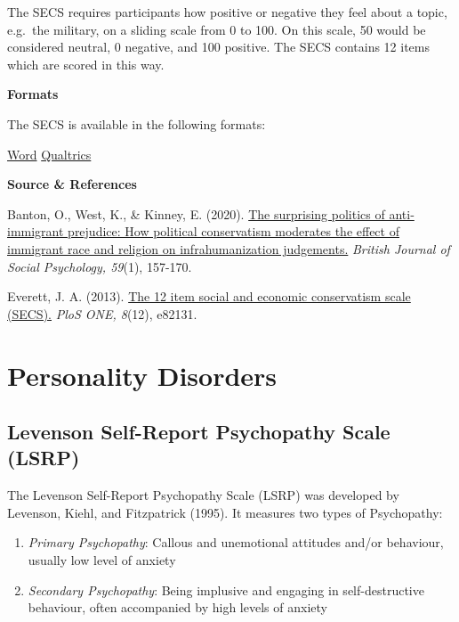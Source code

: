 \documentclass[
]{book}
\providecommand{\tightlist}{%
  \setlength{\itemsep}{0pt}\setlength{\parskip}{0pt}}
\begin{document}
The SECS requires participants how positive or negative they feel about a topic, e.g.~the military, on a sliding scale from 0 to 100. On this scale, 50 would be considered neutral, 0 negative, and 100 positive. The SECS contains 12 items which are scored in this way.

\textbf{Formats}

The SECS is available in the following formats:

\href{/questionnaires/SocialandEconomicConservatismScale.docx}{Word} \textbar{} \href{/questionnaires/SocialandEconomicConservatismScale.qsf}{Qualtrics}

\textbf{Source \& References}

Banton, O., West, K., \& Kinney, E. (2020). \href{https://onlinelibrary.wiley.com/doi/pdf/10.1111/bjso.12337}{The surprising politics of anti‐immigrant prejudice: How political conservatism moderates the effect of immigrant race and religion on infrahumanization judgements.} \emph{British Journal of Social Psychology, 59}(1), 157-170.

Everett, J. A. (2013). \href{https://journals.plos.org/plosone/article/file?id=10.1371/journal.pone.0082131\&type=printable}{The 12 item social and economic conservatism scale (SECS).} \emph{PloS ONE, 8}(12), e82131.

\hypertarget{personality-disorders}{%
\section{Personality Disorders}\label{personality-disorders}}

\hypertarget{levenson-self-report-psychopathy-scale-lsrp}{%
\subsection{Levenson Self-Report Psychopathy Scale (LSRP)}\label{levenson-self-report-psychopathy-scale-lsrp}}

The Levenson Self-Report Psychopathy Scale (LSRP) was developed by Levenson, Kiehl, and Fitzpatrick (1995). It measures two types of Psychopathy:

\begin{enumerate}
\def\labelenumi{\arabic{enumi}.}
\tightlist
\item
  \emph{Primary Psychopathy}: Callous and unemotional attitudes and/or behaviour, usually low level of anxiety
\item
  \emph{Secondary Psychopathy}: Being implusive and engaging in self-destructive behaviour, often accompanied by high levels of anxiety
\end{enumerate}
\end{document}
